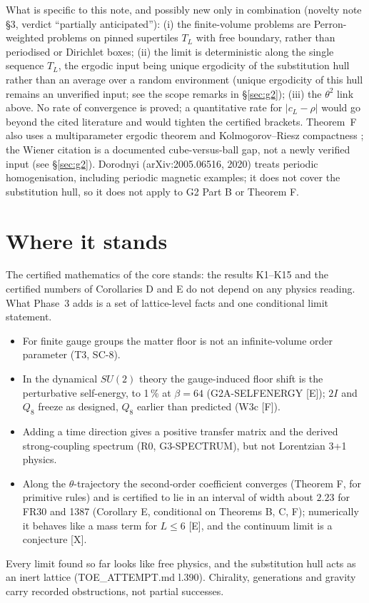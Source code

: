 \documentclass[11pt]{article}
\begin{document}
What is specific to this note, and possibly new only in combination (novelty note \S3, verdict ``partially anticipated''): (i) the finite-volume problems are Perron-weighted problems on pinned supertiles $T_L$ with free boundary, rather than periodised or Dirichlet boxes; (ii) the limit is deterministic along the single sequence $T_L$, the ergodic input being unique ergodicity of the substitution hull \cite{solomyak1997dynamics,solomyak1999corrections} rather than an average over a random environment (unique ergodicity of this hull remains an unverified input; see the scope remarks in \S\ref{sec:g2}); (iii) the $\theta^2$ link above. No rate of convergence is proved; a quantitative rate for $|c_L-\rho|$ would go beyond the cited literature and would tighten the certified brackets.
Theorem~F also uses a multiparameter ergodic theorem \cite{wiener1939ergodic} and Kolmogorov--Riesz compactness \cite{hancheolsen2010kolmogorov}; the Wiener citation is a documented cube-versus-ball gap, not a newly verified input (see \S\ref{sec:g2}).
Dorodnyi (arXiv:2005.06516, 2020) treats periodic homogenisation, including periodic magnetic examples; it does not cover the substitution hull, so it does not apply to G2 Part B or Theorem F.

\section{Where it stands}\label{sec:stands}
The certified mathematics of the core stands: the results K1--K15 and the certified numbers of Corollaries D and E do not depend on any physics reading. What Phase~3 adds is a set of lattice-level facts and one conditional limit statement.
\begin{itemize}
\item For finite gauge groups the matter floor is not an infinite-volume order parameter (T3, SC-8).
\item In the dynamical $SU(2)$ theory the gauge-induced floor shift is the perturbative self-energy, to 1\,\% at $\beta=64$ (G2A-SELFENERGY [E]); $2I$ and $Q_8$ freeze as designed, $Q_8$ earlier than predicted (W3c [F]).
\item Adding a time direction gives a positive transfer matrix and the derived strong-coupling spectrum (R0, G3-SPECTRUM), but not Lorentzian 3+1 physics.
\item Along the $\theta$-trajectory the second-order coefficient converges (Theorem F, for primitive rules) and is certified to lie in an interval of width about $2.23$ for FR30 and 1387 (Corollary E, conditional on Theorems B, C, F); numerically it behaves like a mass term for $L\le6$ [E], and the continuum limit is a conjecture [X].
\end{itemize}
Every limit found so far looks like free physics, and the substitution hull acts as an inert lattice (TOE\_ATTEMPT.md l.390). Chirality, generations and gravity carry recorded obstructions, not partial successes.
\end{document}
